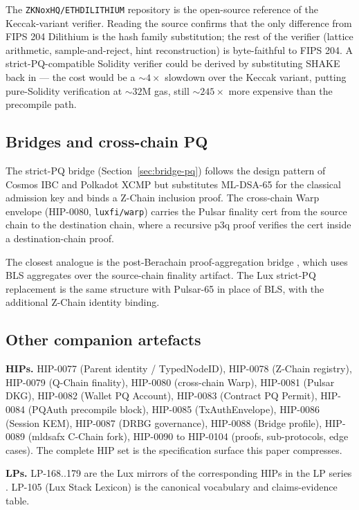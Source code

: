 The \texttt{ZKNoxHQ/ETHDILITHIUM} repository \cite{ethdilithium-repo} is
the open-source reference of the Keccak-variant verifier. Reading the
source confirms that the only difference from FIPS 204 Dilithium is the
hash family substitution; the rest of the verifier (lattice arithmetic,
sample-and-reject, hint reconstruction) is byte-faithful to FIPS 204. A
strict-PQ-compatible Solidity verifier could be derived by substituting
SHAKE back in --- the cost would be a $\sim 4\times$ slowdown over the
Keccak variant, putting pure-Solidity verification at $\sim 32$M gas, still
$\sim 245\times$ more expensive than the precompile path.

\subsection{Bridges and cross-chain PQ}

The strict-PQ bridge (Section~\ref{sec:bridge-pq}) follows the design
pattern of Cosmos IBC \cite{ibc} and Polkadot XCMP \cite{xcmp} but
substitutes ML-DSA-65 for the classical admission key and binds a Z-Chain
inclusion proof. The cross-chain Warp envelope (HIP-0080,
\texttt{luxfi/warp}) carries the Pulsar finality cert from the source
chain to the destination chain, where a recursive p3q proof verifies the
cert inside a destination-chain proof.

The closest analogue is the post-Berachain proof-aggregation bridge
\cite{berachain-bridge}, which uses BLS aggregates over the source-chain
finality artifact. The Lux strict-PQ replacement is the same structure
with Pulsar-65 in place of BLS, with the additional Z-Chain identity
binding.

\subsection{Other companion artefacts}

\textbf{HIPs.} HIP-0077 (Parent identity / TypedNodeID), HIP-0078 (Z-Chain
registry), HIP-0079 (Q-Chain finality), HIP-0080 (cross-chain Warp),
HIP-0081 (Pulsar DKG), HIP-0082 (Wallet PQ Account), HIP-0083
(Contract PQ Permit), HIP-0084 (PQAuth precompile block), HIP-0085
(TxAuthEnvelope), HIP-0086 (Session KEM), HIP-0087 (DRBG governance),
HIP-0088 (Bridge profile), HIP-0089 (mldsafx C-Chain fork), HIP-0090 to
HIP-0104 (proofs, sub-protocols, edge cases). The complete HIP set is the
specification surface this paper compresses.

\textbf{LPs.} LP-168..179 are the Lux mirrors of the corresponding HIPs in
the LP series \cite{lps}. LP-105 (Lux Stack Lexicon) is the canonical
vocabulary and claims-evidence table.


